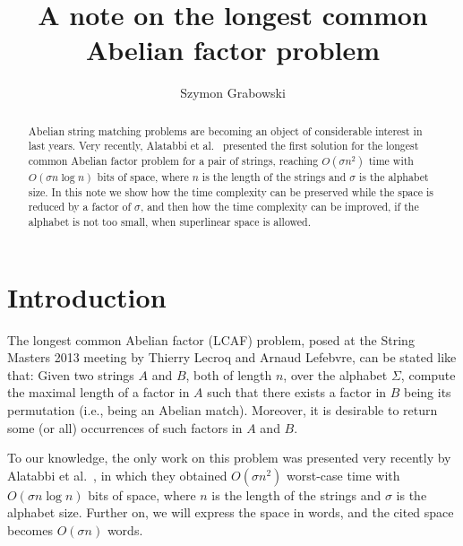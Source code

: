 \documentclass{llncs}
\begin{document}
\title{A note on the longest common Abelian factor problem}

\author{Szymon Grabowski}


\maketitle

\begin{abstract}
Abelian string matching problems are becoming an object of 
considerable interest in last years.
Very recently, Alatabbi et al.~\cite{AILR2015} presented the first solution 
for the longest common Abelian factor problem for a pair of strings, 
reaching $O(\sigma n^2)$ time with $O(\sigma n \log n)$ bits of space, 
where $n$ is the length of the strings and $\sigma$ is the alphabet size.
In this note we show how the time complexity can be preserved while 
the space is reduced by a factor of $\sigma$, and then how the time 
complexity can be improved, if the alphabet is not too small, 
when superlinear space is allowed.
\end{abstract}

\section{Introduction}
\noindent 
The longest common Abelian factor (LCAF) problem, posed at the 
String Masters 2013 meeting by Thierry Lecroq and Arnaud Lefebvre, 
can be stated like that:
Given two strings $A$ and $B$, both of length $n$, over the alphabet 
$\Sigma$, 
compute the maximal length of a factor in $A$ such that there exists 
a factor in $B$ being its permutation (i.e., being an Abelian match).
Moreover, it is desirable to return some (or all) occurrences of 
such factors in $A$ and $B$. 

To our knowledge, the only work on this problem was presented 
very recently by Alatabbi et al.~\cite{AILR2015}, in which 
they obtained $O(\sigma n^2)$ worst-case time 
with $O(\sigma n \log n)$ bits of space, 
where $n$ is the length of the strings and $\sigma$ is the alphabet size.
Further on, we will express the space in words, and the cited space 
becomes $O(\sigma n)$ words.
\end{document}
